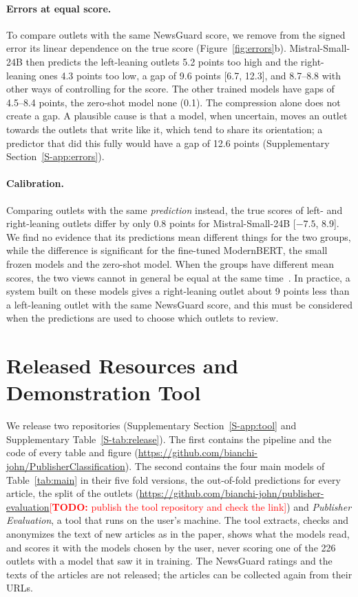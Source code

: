 \documentclass[11pt,a4paper]{article}
\newcommand{\todo}[1]{\textcolor{red}{[\textbf{TODO:} #1]}}
\begin{document}
\paragraph{Errors at equal score.} To compare outlets with the same NewsGuard score, we remove from the signed error its
linear dependence on the true score (Figure~\ref{fig:errors}b). Mistral-Small-24B then predicts the left-leaning outlets
5.2 points too high and the right-leaning ones 4.3 points too low, a gap of 9.6 points [6.7, 12.3], and 8.7--8.8 with
other ways of controlling for the score. The other trained models have gaps of 4.5--8.4 points, the zero-shot model none
(0.1). The compression alone does not create a gap. A plausible cause is that a model, when uncertain, moves an outlet
towards the outlets that write like it, which tend to share its orientation; a predictor that did this fully would have a gap of 12.6 points (Supplementary Section~\ref{S-app:errors}).

\paragraph{Calibration.} Comparing outlets with the same \emph{prediction} instead, the true scores of left- and
right-leaning outlets differ by only 0.8 points for Mistral-Small-24B [$-7.5$, 8.9]. We find no evidence that its
predictions mean different things for the two groups, while the difference is significant for the fine-tuned ModernBERT,
the small frozen models and the zero-shot model. When the groups have different mean scores, the two views cannot in
general be equal at the same time~\cite{kleinberg2017inherent,chouldechova2017fair}. In practice, a system built on these
models gives a right-leaning outlet about 9 points less than a left-leaning outlet with the same NewsGuard score, and
this must be considered when the predictions are used to choose which outlets to review.

\section{Released Resources and Demonstration Tool}\label{sec:tool}
We release two repositories (Supplementary Section~\ref{S-app:tool} and Supplementary Table~\ref{S-tab:release}). The
first contains the pipeline and the code of every table and figure
(\url{https://github.com/bianchi-john/PublisherClassification}). The second contains the four main models of
Table~\ref{tab:main} in their five fold versions, the out-of-fold predictions for every article, the split of the
outlets (\url{https://github.com/bianchi-john/publisher-evaluation}\todo{publish the tool repository and check the link})
and \emph{Publisher Evaluation}, a tool that runs on the user's machine. The tool extracts, checks and anonymizes the
text of new articles as in the paper, shows what the models read, and scores it with the models chosen by the user,
never scoring one of the 226 outlets with a model that saw it in training. The NewsGuard ratings and the texts of the
articles are not released; the articles can be collected again from their URLs.
\end{document}
